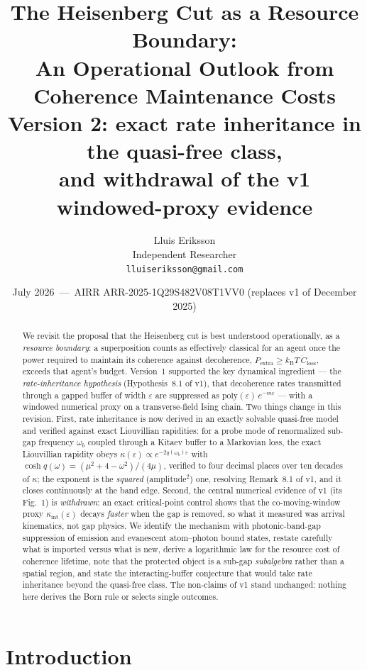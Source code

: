 \documentclass[11pt,a4paper]{article}
\title{The Heisenberg Cut as a Resource Boundary:\\
An Operational Outlook from Coherence Maintenance Costs\\[2mm]
\large Version 2: exact rate inheritance in the quasi-free class,\\
and withdrawal of the v1 windowed-proxy evidence}
\author{Lluis Eriksson\\[1mm] \small Independent Researcher\\ \small \texttt{lluiseriksson@gmail.com}}
\date{July 2026 \,---\, AIRR ARR-2025-1Q29S482V08T1VV0 (replaces v1 of December 2025)}
\theoremstyle{remark}
\newcommand{\eps}{\varepsilon}
\newcommand{\kB}{k_{\mathrm{B}}}
\begin{document}
\maketitle

\begin{abstract}
\noindent
We revisit the proposal that the Heisenberg cut is best understood operationally, as a
\emph{resource boundary}: a superposition counts as effectively classical for an agent once
the power required to maintain its coherence against decoherence,
$P_{\mathrm{extra}} \geq \kB T\, \dot C_{\mathrm{loss}}$, exceeds that agent's budget.
Version~1 supported the key dynamical ingredient --- the \emph{rate-inheritance hypothesis}
(Hypothesis~8.1 of v1), that decoherence rates transmitted through a gapped buffer of width
$\eps$ are suppressed as $\mathrm{poly}(\eps)\,e^{-m\eps}$ --- with a windowed numerical
proxy on a transverse-field Ising chain. Two things change in this revision. First, rate
inheritance is now derived in an exactly solvable quasi-free model and verified against
exact Liouvillian rapidities: for a probe mode of
renormalized sub-gap frequency $\omega_b$ coupled through a Kitaev buffer to a Markovian
loss, the exact Liouvillian rapidity obeys
$\kappa(\eps) \propto e^{-2q(\omega_b)\eps}$ with
$\cosh q(\omega) = (\mu^2+4-\omega^2)/(4\mu)$, verified to four decimal places over ten
decades of $\kappa$; the exponent is the \emph{squared} (amplitude$^2$) one, resolving
Remark~8.1 of v1, and it closes continuously at the band edge. Second, the central numerical
evidence of v1 (its Fig.~1) is \emph{withdrawn}: an exact critical-point control shows that
the co-moving-window proxy $\kappa_{\mathrm{int}}(\eps)$ decays \emph{faster} when the gap
is removed, so what it measured was arrival kinematics, not gap physics. We identify the
mechanism with photonic-band-gap suppression of emission and evanescent atom--photon bound
states, restate carefully what is imported versus what is new, derive a logarithmic law for
the resource cost of coherence lifetime, note that the protected object is a sub-gap
\emph{subalgebra} rather than a spatial region, and state the interacting-buffer conjecture
that would take rate inheritance beyond the quasi-free class. The non-claims of v1 stand
unchanged: nothing here derives the Born rule or selects single outcomes.
\end{abstract}

\section{Introduction}
\end{document}
